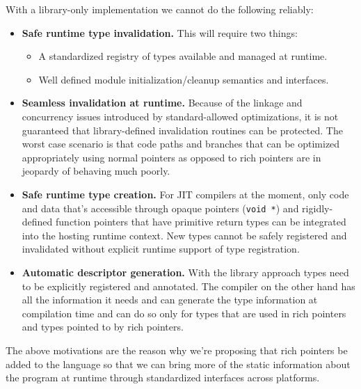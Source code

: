With a library-only implementation we cannot do the following reliably:

\begin{itemize}
	\item \textbf{Safe runtime type invalidation.} This will require two things:
	\begin{itemize}
		\item A standardized registry of types available and managed at runtime.
		\item Well defined module initialization/cleanup semantics and interfaces.
	\end{itemize}
	\item \textbf{Seamless invalidation at runtime.} Because of the linkage and concurrency issues introduced by standard-allowed optimizations, it is not guaranteed that library-defined invalidation routines can be protected. The worst case scenario is that code paths and branches that can be optimized appropriately using normal pointers as opposed to rich pointers are in jeopardy of behaving much poorly.
	\item \textbf{Safe runtime type creation.} For JIT compilers at the moment, only code and data that’s accessible through opaque pointers (\verb+void *+) and rigidly-defined function pointers that have primitive return types can be integrated into the hosting runtime context. New types cannot be safely registered and invalidated without explicit runtime support of type registration.
	\item \textbf{Automatic descriptor generation.} With the library approach types need to be explicitly registered and annotated. The compiler on the other hand has all the information it needs and can generate the type information at compilation time and can do so only for types that are used in rich pointers and types pointed to by rich pointers.
\end{itemize}

The above motivations are the reason why we’re proposing that rich pointers be added to the language so that we can bring more of the static information about the program at runtime through standardized interfaces across platforms.